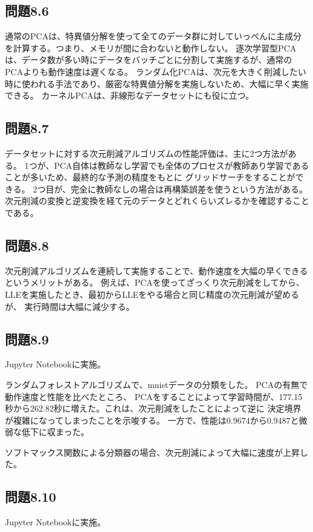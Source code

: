 \documentclass[a4j,twocolumn]{jsarticle}
\begin{document}
\subsection{問題8.6}
通常のPCAは、特異値分解を使って全てのデータ群に対していっぺんに主成分を計算する。つまり、メモリが間に合わないと動作しない。
逐次学習型PCAは、データ数が多い時にデータをバッチごとに分割して実施するが、通常のPCAよりも動作速度は遅くなる。
ランダム化PCAは、次元を大きく削減したい時に使われる手法であり、厳密な特異値分解を実施しないため、大幅に早く実施できる。
カーネルPCAは、非線形なデータセットにも役に立つ。

\subsection{問題8.7}
データセットに対する次元削減アルゴリズムの性能評価は、主に2つ方法がある。
1つが、PCA自体は教師なし学習でも全体のプロセスが教師あり学習であることが多いため、最終的な予測の精度をもとに
グリッドサーチをすることができる。
2つ目が、完全に教師なしの場合は再構築誤差を使うという方法がある。次元削減の変換と逆変換を経て元のデータとどれくらいズレるかを確認することである。

\subsection{問題8.8}
次元削減アルゴリズムを連続して実施することで、動作速度を大幅の早くできるというメリットがある。
例えば、PCAを使ってざっくり次元削減をしてから、LLEを実施したとき、最初からLLEをやる場合と同じ精度の次元削減が望めるが、
実行時間は大幅に減少する。

\subsection{問題8.9}
Jupyter Notebookに実施。

ランダムフォレストアルゴリズムで、mnistデータの分類をした。
PCAの有無で動作速度と性能を比べたところ、
PCAをすることによって学習時間が、177.15秒から262.82秒に増えた。これは、次元削減をしたことによって逆に
決定境界が複雑になってしまったことを示唆する。
一方で、性能は0.9674から0.9487と微弱な低下に収まった。

ソフトマックス関数による分類器の場合、次元削減によって大幅に速度が上昇した。

\subsection{問題8.10}
Jupyter Notebookに実施。
\end{document}
